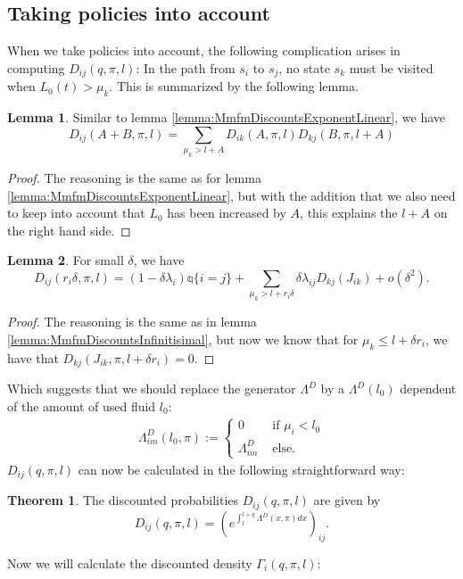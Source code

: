 \documentclass[a4paper]{thesis}
\theoremstyle{definition}
\newtheorem{theorem}{Theorem}[section]
\newtheorem{lemma}{Lemma}
\begin{document}
\subsection{Taking policies into account}
When we take policies into account, the following complication arises in computing $D_{ij}(q, \pi,l)$:
In the path from $s_i$ to $s_j$, no state $s_k$ must be visited when $L_0(t)>\mu_k$.
This is summarized by the following lemma.
\begin{lemma}
	Similar to lemma \ref{lemma:MmfmDiscountsExponentLinear}, we have
	\[
	D_{ij}(A+B,\pi,l)=\sum\limits_{\mu_k>l+A} D_{ik}(A,\pi,l)D_{kj}(B,\pi,l+A)
	\]
	\begin{proof}
		The reasoning is the same as for lemma \ref{lemma:MmfmDiscountsExponentLinear}, but with the addition that we also need to keep into account that $L_0$ has been increased by $A$, this explains the $l+A$ on the right hand side.
	\end{proof}
\end{lemma}

\begin{lemma}
	For small $\delta$, we have
	\[
	D_{ij}(r_i\delta,\pi,l)=(1-\delta\lambda_i)\mathds{q}\{i=j\}+\sum\limits_{\mu_k>l+r_i\delta}\delta\lambda_{ij}D_{kj}(J_{ik})+o(\delta^2).
	\]
	\begin{proof}
		The reasoning is the same as in lemma \ref{lemma:MmfmDiscountsInfinitisimal}, but now we know that for $\mu_k\leq l+\delta r_i$, we have that $D_{kj}(J_{ik},\pi,l+\delta r_i)=0$.
	\end{proof}
\end{lemma}
Which suggests that we should replace the generator $\Lambda^D$ by a $\Lambda^D(l_0)$ dependent of the amount of used fluid $l_0$:
\begin{equation}
\begin{split}
\Lambda^D_{im}(l_0,\pi):=\begin{cases}
0&\text{ if }\mu_i<l_0\\
\Lambda^D_{im}&\text{ else.}
\end{cases}
\end{split}
\end{equation}
$D_{ij}(q, \pi,l)$ can now be calculated in the following straightforward way:
\begin{theorem}
	The discounted probabilities $D_{ij}(q, \pi,l)$ are given by
	\[
	D_{ij}(q, \pi,l)=\left(e^{\int_l^{l+q}\Lambda^D(x,\pi)dx}\right)_{ij}.
	\]
\end{theorem}
Now we will calculate the discounted density $\Gamma_i(q,\pi,l)$:
\end{document}
